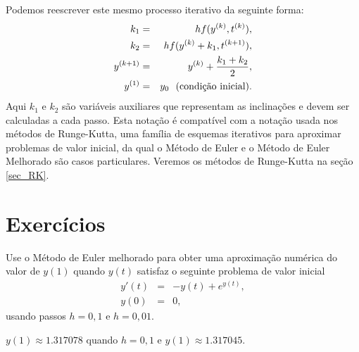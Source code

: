Podemos reescrever este mesmo processo iterativo da seguinte forma:
\begin{eqnarray*}
k_1&=&hf(y^{(k)},t^{(k)}),\\
k_2&=&hf(y^{(k)}+k_1,t^{(k+1)}),\\
y^{(k+1)}&=&y^{(k)}+\frac{k_1+k_2}{2},\\
y^{(1)}&=&y_0~~ \hbox{(condição inicial)}.
\end{eqnarray*}
Aqui $k_1$ e $k_2$ são variáveis auxiliares que representam as inclinações e devem ser calculadas a cada passo. Esta notação é compatível com a notação usada nos métodos de Runge-Kutta, uma família de esquemas iterativos para aproximar problemas de valor inicial, da qual o Método de Euler e o Método de Euler Melhorado são casos particulares. Veremos os métodos de Runge-Kutta na seção \ref{sec_RK}.


\section*{Exercícios}

\begin{Exercise} Use o Método de Euler melhorado para obter uma aproximação numérica do valor de $y(1)$ quando $y(t)$ satisfaz o seguinte problema de valor inicial
\begin{eqnarray*}
 y'(t)&=&-y(t)+ e^{y(t)},\\
 y(0)&=&0,
\end{eqnarray*}
usando passos $h=0,1$ e $h=0,01$.
\end{Exercise}
\begin{Answer}
 $y(1)\approx 1.317078$ quando $h=0,1$ e $y(1)\approx 1.317045 $.
\end{Answer}


